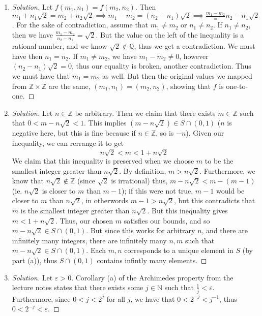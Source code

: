 \documentclass{article}
\newcommand{\N}{{\mathbb N}}
\newcommand{\Z}{{\mathbb Z}}
\newcommand{\Q}{{\mathbb Q}}
\newcommand{\ep}{{\varepsilon}}
\begin{document}
\begin{enumerate}
	\item \begin{proof}[Solution]\let\qed\relax
		Let $f(m_1,n_1) = f(m_2,n_2)$.
		Then $m_1 + n_1 \sqrt{2} = m_2 + n_2\sqrt{2} \implies m_1 - m_2 = (n_2 - n_1)\sqrt{2}
		\implies \frac{m_1 - m_2} = {n_2 - n_1}\sqrt{2}$.
		For the sake of contradiction,
		assume that $m_1 \neq m_2$ or $n_1 \neq n_2$.
		If $n_1 \neq n_2$, then we have $\frac{m_1 - m_2}{n_2 - n_1} = \sqrt{2}$.
		But the value on the left of the inequality is a rational number,
		and we know $\sqrt{2} \not\in \Q$,
		thus we get a contradiction.
		We must have then $n_1 = n_2$.
		If $m_1 \neq m_2$, we have $m_1 - m_2 \neq 0$,
		however $(n_2 - n_1)\sqrt{2} = 0$,
		thus our equality is broken, another contradiction.
		Thus we must have that $m_1 = m_2$ as well.
		But then the original values we mapped from $\Z\times\Z$
		are the same,
		$(m_1,n_1) = (m_2,n_2)$,
		showing that $f$ is one-to-one.
	\end{proof}
	\item \begin{proof}[Solution]\let\qed\relax
		Let $n\in \Z$ be arbitrary.
		Then we claim that there exists $m \in \Z$
		such that $0 < m - n\sqrt{2} < 1$.
		This implies $(m - n\sqrt{2}) \in S \cap (0,1)$
		($n$ is negative here, but this is fine because if $n\in\Z$, so is $-n$).
		Given our inequality, we can rerrange it to get
		\[
			n\sqrt{2} < m <1 + n\sqrt{2}
		\]
		We claim that this inequality is preserved
		when we choose $m$ to be the smallest integer
		greater than $n\sqrt{2}$.
		By definition, $m > n\sqrt{2}$.
		Furthermore, we know that $n\sqrt{2} \not\in \Z$
		(since $\sqrt{2}$ is irrational)
		thus, $m - n\sqrt{2} < m - (m - 1)$
		(ie. $n\sqrt{2}$ is closer to $m$ than $m - 1$);
		if this were not true, $m - 1$ would be closer to $m$
		than $n\sqrt{2}$,
		in otherwords $m - 1 > n\sqrt{2}$,
		but this contradicts that $m$ is the smallest integer greater than $n\sqrt{2}$.
		But this inequality gives $m < 1 + n\sqrt{2}$.
		Thus, our chosen $m$ satisfies our bounds,
		and so $m - n\sqrt{2} \in S \cap (0,1)$.
		But since this works for arbitrary $n$,
		and there are infinitely many integers,
		there are infinitely many $n,m$ such that $m - n\sqrt{2} \in S \cap (0,1)$.
		Each $m,n$ corresponds to a unique element in $S$ (by part (a)),
		thus $S \cap (0,1)$ contains infintly many elements.
	\end{proof}
	\item \begin{proof}[Solution]\let\qed\relax
		Let $\ep > 0$.
		Corollary (a) of the Archimedes property from the lecture notes
		states that there exists some $j \in \N$ such that
		$\frac{1}{j} < \ep$.
		Furthermore, since $0 < j < 2^j$ for all $j$,
		we have that $0 < 2^{-j} < j^{-1}$,
		thus $0 < 2^{-j} < \ep$.


\end{proof}
\end{enumerate}
\end{document}
